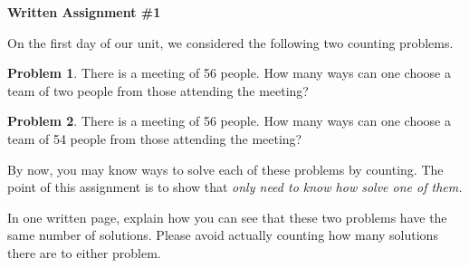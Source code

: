 \documentclass[12pt,letterpaper]{article}
\theoremstyle{definition}
\newtheorem{problem}{Problem}
\begin{document}
\setlength{\parskip}{1ex plus 0.5ex minus 0.2ex}
\setlength{\parindent}{0pt}

\pagestyle{fancy}
\lfoot{}
\rfoot{}

\begin{center}
{
\Large
\textbf{Written Assignment \#1}
}
\end{center}

On the first day of our unit, we considered the following two counting problems.

\begin{problem}
There is a meeting of 56 people. How many ways can one choose a team of two people from those attending the meeting?
\end{problem}

\begin{problem}
There is a meeting of 56 people. How many ways can one choose a team of 54 people from those attending the meeting?
\end{problem}

By now, you may know ways to solve each of these problems by counting. 
The point of this assignment is to show that \emph{only need to know how solve one of them.}

In one written page, explain how you can see that these two problems have the same number of solutions. 
Please avoid actually counting how many solutions there are to either problem.
\end{document}
